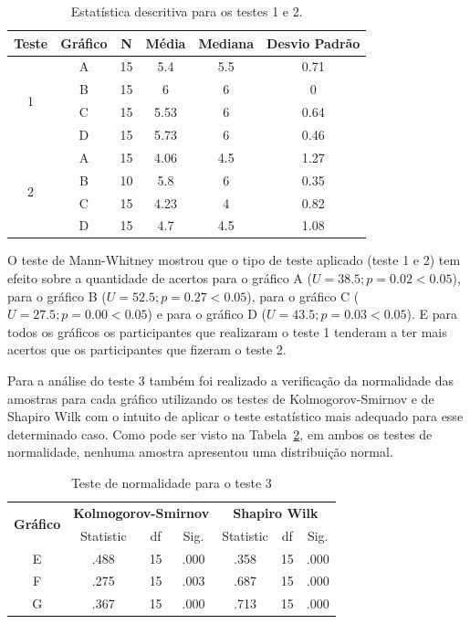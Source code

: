 \documentclass[
	12pt,				%
	openright,			%
	oneside,			%
	a4paper,			%
	english,			%
	brazil				%
	]{abntex2}
\begin{document}
\begin{table}[!h]
\centering
\def\arraystretch{1.25}
\caption{Estatística descritiva para os testes 1 e 2.}
\label{tab:mann}
\begin{tabular}{|c|c|c|c|c|c|}

\hline
\textbf{Teste}&\textbf{Gráfico}&\textbf{N}&\textbf{Média}&\textbf{Mediana}&\textbf{Desvio Padrão}\\
\hline
\multirow{4}{*}{1}&A&15&5.4&5.5&0.71\\\cline{2-6}
&B&15&6&6&0\\\cline{2-6}
&C&15&5.53&6&0.64\\\cline{2-6}
&D&15&5.73&6&0.46\\\cline{1-6}
\multirow{4}{*}{2}&A&15&4.06&4.5&1.27\\\cline{2-6}
&B&10&5.8&6&0.35\\\cline{2-6}
&C&15&4.23&4&0.82\\\cline{2-6}
&D&15&4.7&4.5&1.08\\\cline{2-6}


\hline
\end{tabular}
\end{table}

O teste de Mann-Whitney mostrou que o tipo de teste aplicado (teste 1 e 2) tem efeito sobre a quantidade de acertos para o gráfico A ($U = 38.5; p = 0.02 < 0.05$), para o gráfico B ($U = 52.5; p = 0.27 < 0.05$), para o gráfico C ($U = 27.5; p = 0.00 < 0.05$) e para o gráfico D ($U = 43.5; p = 0.03 < 0.05$). E para todos os gráficos os participantes que realizaram o teste 1 tenderam a ter mais acertos que os participantes que fizeram o teste 2.

Para a análise do teste 3 também foi realizado a verificação da normalidade das amostras para cada gráfico utilizando os testes de Kolmogorov-Smirnov e de Shapiro Wilk com o intuito de aplicar o teste estatístico mais adequado para esse determinado caso. Como pode ser visto na Tabela~\ref{tab:test3_normality}, em ambos os testes de normalidade,  nenhuma amostra apresentou uma distribuição normal.

\begin{table}[!h]
\centering
\def\arraystretch{1.25}
\caption{Teste de normalidade para o teste 3}
\label{tab:test3_normality}
\begin{tabular}{|c|c|c|c|c|c|c|}

\hline
\multirow{ 2}{*}{\textbf{Gráfico}} & \multicolumn{3}{|c|}{\textbf{Kolmogorov-Smirnov}} &\multicolumn{3}{|c|}{\textbf{Shapiro Wilk}}\\\cline{2-7}
& Statistic & df & Sig. & Statistic & df & Sig.\\
\hline
 E & .488 & 15 & .000 & .358 & 15 & .000 \\
 F & .275 & 15 & .003 & .687 & 15 & .000 \\
 G & .367 & 15 & .000 & .713 & 15 & .000 \\


\hline
\end{tabular}
\end{table}
\end{document}
